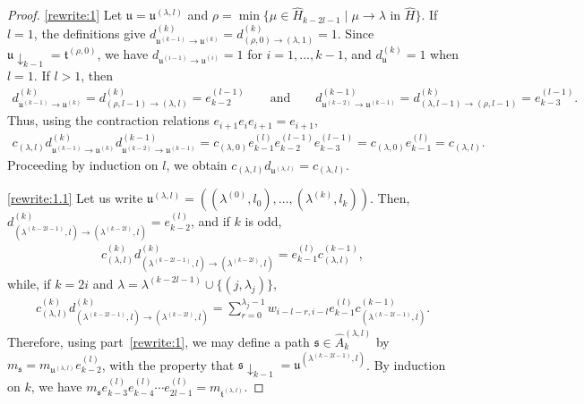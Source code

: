 \documentclass[11pt,a4paper,reqno,svgnames]{amsart}
\theoremstyle{plain}
\theoremstyle{definition}
\numberwithin{equation}{section}
\begin{document}
\begin{proof}
\eqref{rewrite:1} 
Let $\mathfrak{u}=\mathfrak{u}^{(\lambda,l)}$ and $\rho=\min\lbrace\mu\in \widehat{H}_{k-2l-1}\mid \mu\to \lambda\text{ in }\widehat{H}\rbrace$. If $l=1$, the definitions give  $d^{(k)}_{\mathfrak{u}^{(k-1)}\to\mathfrak{u}^{(k)}} =d^{(k)}_{(\rho,0)\to(\lambda,1)}=1$. Since $\mathfrak{u}\downarrow_{k-1}=\mathfrak{t}^{(\rho,0)}$, we have $d_{\mathfrak{u}^{(i-1)}\to\mathfrak{u}^{(i)}}=1$ for $i=1,\ldots,k-1$, and  $d_\mathfrak{u}^{(k)}=1$ when $l=1$. If $l>1$, then 
\begin{align*}
d_{\mathfrak{u}^{(k-1)}\to \mathfrak{u}^{(k)}}^{(k)}= d^{(k)}_{(\rho,l-1)\to(\lambda,l)}= e_{k-2}^{(l-1)} \qquad\text{and}\qquad  d_{\mathfrak{u}^{(k-2)}\to \mathfrak{u}^{(k-1)}}^{(k-1)}= d^{(k)}_{(\lambda,l-1)\to(\rho,l-1)}= e_{k-3}^{(l-1)}.
\end{align*}
Thus, using the contraction relations $e_{i+1}e_ie_{i+1}=e_{i+1}$, 
\begin{align*}
c_{(\lambda,l)}d_{\mathfrak{u}^{(k-1)}\to \mathfrak{u}^{(k)}}^{(k)} d_{\mathfrak{u}^{(k-2)}\to \mathfrak{u}^{(k-1)}}^{(k-1)} =c_{(\lambda,0)}e_{k-1}^{(l)} e_{k-2}^{(l-1)}e_{k-3}^{(l-1)}=c_{(\lambda,0)}e_{k-1}^{(l)} =c_{(\lambda,l)}. 
\end{align*}
Proceeding by induction on $l$, we obtain $c_{(\lambda,l)}d_{\mathfrak{u}^{(\lambda,l)}} =c_{(\lambda,l)}$. 

\eqref{rewrite:1.1} Let us write $\mathfrak{u}^{(\lambda,l)}=((\lambda^{(0)},l_0),\ldots,(\lambda^{(k)},l_k))$. Then, $d_{(\lambda^{(k-2l-1)},l)\to(\lambda^{(k-2l)},l)}^{(k)}=e_{k-2}^{(l)}$, and if $k$ is odd,
\begin{align*}
c_{(\lambda,l)}^{(k)}d_{(\lambda^{(k-2l-1)},l)\to(\lambda^{(k-2l)},l)}^{(k)}=e_{k-1}^{(l)}c_{(\lambda,l)}^{(k-1)}, 
\end{align*}
while, if $k=2i$ and $\lambda=\lambda^{(k-2l-1)}\cup\lbrace (j,\lambda_j)\rbrace$, 
\begin{align*}
c_{(\lambda,l)}^{(k)}d_{(\lambda^{(k-2l-1)},l)\to(\lambda^{(k-2l)},l)}^{(k)}={\displaystyle\sum_{r=0}^{\lambda_{j}-1} w_{i-l-r,i-l}e_{k-1}^{(l)} c_{(\lambda^{(k-2l-1)},l)}^{(k-1)}}.
\end{align*}
Therefore, using part~\eqref{rewrite:1}, we may define a path $\mathfrak{s}\in\hat{A}_{k}^{(\lambda,l)}$ by $m_\mathfrak{s}=m_{\mathfrak{u}^{(\lambda,l)}}e_{k-2}^{(l)}$, with the property that $\mathfrak{s}\downarrow_{k-1}=\mathfrak{u}^{(\lambda^{(k-2l-1)},l)}$. By induction on $k$, we have $m_\mathfrak{s}e_{k-3}^{(l)}e_{k-4}^{(l)}\cdots e_{2l-1}^{(l)}=m_{\mathfrak{t}^{(\lambda,l)}}$. 


\end{proof}
\end{document}
